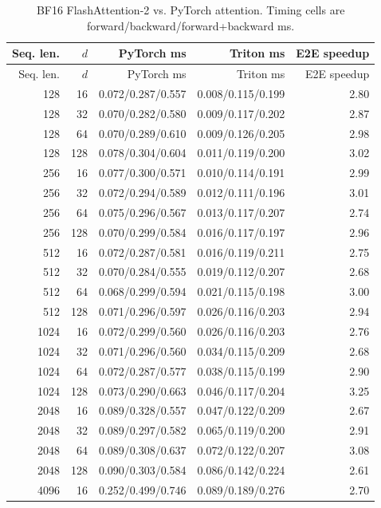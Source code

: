 \documentclass[11pt]{article}
\begin{document}
{\scriptsize
\setlength{\tabcolsep}{3pt}
\begin{longtable}{rrrrr}
  \caption{BF16 FlashAttention-2 vs. PyTorch attention. Timing cells are forward/backward/forward+backward ms.}\\
  \toprule
  Seq. len. & $d$ & PyTorch ms & Triton ms & E2E speedup \\
  \midrule
  \endfirsthead
  \toprule
  Seq. len. & $d$ & PyTorch ms & Triton ms & E2E speedup \\
  \midrule
  \endhead
  128 & 16 & 0.072/0.287/0.557 & 0.008/0.115/0.199 & 2.80 \\
  128 & 32 & 0.070/0.282/0.580 & 0.009/0.117/0.202 & 2.87 \\
  128 & 64 & 0.070/0.289/0.610 & 0.009/0.126/0.205 & 2.98 \\
  128 & 128 & 0.078/0.304/0.604 & 0.011/0.119/0.200 & 3.02 \\
  256 & 16 & 0.077/0.300/0.571 & 0.010/0.114/0.191 & 2.99 \\
  256 & 32 & 0.072/0.294/0.589 & 0.012/0.111/0.196 & 3.01 \\
  256 & 64 & 0.075/0.296/0.567 & 0.013/0.117/0.207 & 2.74 \\
  256 & 128 & 0.070/0.299/0.584 & 0.016/0.117/0.197 & 2.96 \\
  512 & 16 & 0.072/0.287/0.581 & 0.016/0.119/0.211 & 2.75 \\
  512 & 32 & 0.070/0.284/0.555 & 0.019/0.112/0.207 & 2.68 \\
  512 & 64 & 0.068/0.299/0.594 & 0.021/0.115/0.198 & 3.00 \\
  512 & 128 & 0.071/0.296/0.597 & 0.026/0.116/0.203 & 2.94 \\
  1024 & 16 & 0.072/0.299/0.560 & 0.026/0.116/0.203 & 2.76 \\
  1024 & 32 & 0.071/0.296/0.560 & 0.034/0.115/0.209 & 2.68 \\
  1024 & 64 & 0.072/0.287/0.577 & 0.038/0.115/0.199 & 2.90 \\
  1024 & 128 & 0.073/0.290/0.663 & 0.046/0.117/0.204 & 3.25 \\
  2048 & 16 & 0.089/0.328/0.557 & 0.047/0.122/0.209 & 2.67 \\
  2048 & 32 & 0.089/0.297/0.582 & 0.065/0.119/0.200 & 2.91 \\
  2048 & 64 & 0.089/0.308/0.637 & 0.072/0.122/0.207 & 3.08 \\
  2048 & 128 & 0.090/0.303/0.584 & 0.086/0.142/0.224 & 2.61 \\
  4096 & 16 & 0.252/0.499/0.746 & 0.089/0.189/0.276 & 2.70 \\

\end{longtable}}
\end{document}
